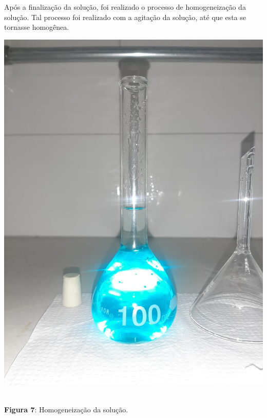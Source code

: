 \documentclass[a4paper, 11pt]{article}
\begin{document}
        \indent Após a finalização da solução, foi realizado o processo de homogeneização da solução\@. Tal processo foi realizado
        com a agitação da solução, até que esta se tornasse homogênea\@.\\
        \begin{center}
            \parbox{7cm}{\includegraphics[scale=0.2]{10; solucao finalizada.png}}\\
            \singlespacing
            \textbf{Figura 7}: Homogeneização da solução\@.
        \end{center}
        \doublespacing
\end{document}

